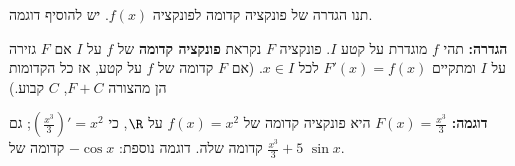 
\begin{question}
תנו הגדרה של פונקציה קדומה לפונקציה $f(x)$. יש להוסיף דוגמה.
\end{question}

\begin{solution}
\textbf{הגדרה:} תהי $f$ מוגדרת על קטע $I$. פונקציה $F$ נקראת \textbf{פונקציה קדומה} של $f$ על $I$ אם $F$ גזירה על $I$ ומתקיים $F'(x)=f(x)$ לכל $x\in I$.
(אם $F$ קדומה של $f$ על קטע, אז כל הקדומות הן מהצורה $F+C$, $C$ קבוע.)

\textbf{דוגמה:} $F(x)=\frac{x^3}{3}$ היא פונקציה קדומה של $f(x)=x^2$ על $\R$, כי $\left(\frac{x^3}{3}\right)'=x^2$; גם $\frac{x^3}{3}+5$ קדומה שלה. דוגמה נוספת: $-\cos x$ קדומה של $\sin x$.
\end{solution}

